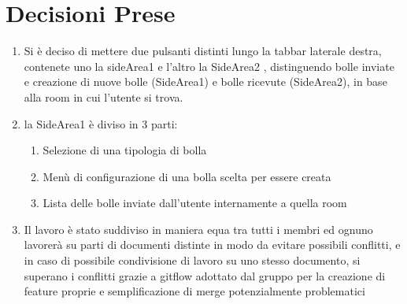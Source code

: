 \documentclass[10 pt,a4paper, openany]{article}
\begin{document}
\section{Decisioni Prese}
\begin{enumerate}
	\item Si è deciso di mettere due pulsanti distinti lungo la tabbar laterale destra, contenete uno la sideArea1 e l'altro la SideArea2 , distinguendo bolle inviate e creazione di nuove bolle (SideArea1) e bolle ricevute (SideArea2), in base alla room in cui l'utente si trova.

	\item la SideArea1 è diviso in 3 parti:
			\begin{enumerate}
				\item Selezione di una tipologia di bolla
				\item Menù di configurazione di una bolla scelta per essere creata
				\item Lista delle bolle inviate dall'utente internamente a quella room
			\end{enumerate}
			

	\item Il lavoro è stato suddiviso in maniera equa tra tutti i membri ed ognuno lavorerà su parti di documenti distinte in modo da evitare possibili conflitti, e in caso di possibile condivisione di lavoro su uno stesso documento, si superano i conflitti grazie a gitflow adottato dal gruppo per la creazione di feature proprie e semplificazione di merge potenzialmente problematici 
	
	
\end{enumerate}
\end{document}
